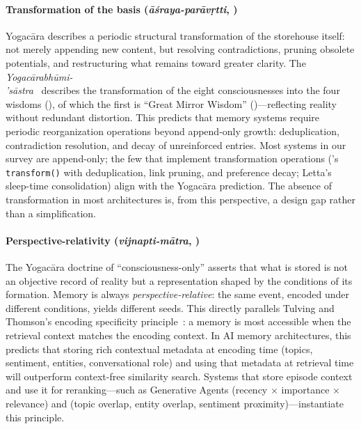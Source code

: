 \paragraph{Transformation of the basis (\emph{\=a\'sraya-par\=av\d{r}tti},
)}
Yogac\=ara describes a periodic structural transformation of the
storehouse itself: not merely appending new content, but resolving
contradictions, pruning obsolete potentials, and restructuring what
remains toward greater clarity.  The
\emph{Yogac\=arabh\=umi-\\'s\=astra}~\cite{yogacarabhumi} describes
the transformation of the eight consciousnesses into the four wisdoms
(), of which the first is ``Great Mirror Wisdom''
()---reflecting reality without redundant distortion.
This predicts that memory systems require periodic reorganization
operations beyond append-only growth: deduplication, contradiction
resolution, and decay of unreinforced entries.  Most systems in our
survey are append-only; the few that implement transformation operations
(\alaya{}'s \texttt{transform()} with deduplication, link pruning, and
preference decay; Letta's~\cite{packer2023memgpt} sleep-time
consolidation) align with the Yogac\=ara prediction.  The absence of
transformation in most architectures is, from this perspective, a
design gap rather than a simplification.

\paragraph{Perspective-relativity (\emph{vijnapti-m\=atra}, )}
The Yogac\=ara doctrine of ``consciousness-only'' asserts that what is
stored is not an objective record of reality but a representation shaped
by the conditions of its formation.  Memory is always
\emph{perspective-relative}: the same event, encoded under different
conditions, yields different seeds.  This directly parallels Tulving and
Thomson's encoding specificity principle~\cite{tulving1973}: a memory is
most accessible when the retrieval context matches the encoding context.
In AI memory architectures, this predicts that storing rich contextual
metadata at encoding time (topics, sentiment, entities, conversational
role) and using that metadata at retrieval time will outperform
context-free similarity search.  Systems that store episode context and
use it for reranking---such as Generative Agents (recency $\times$
importance $\times$ relevance) and \alaya{} (topic overlap, entity
overlap, sentiment proximity)---instantiate this principle.

